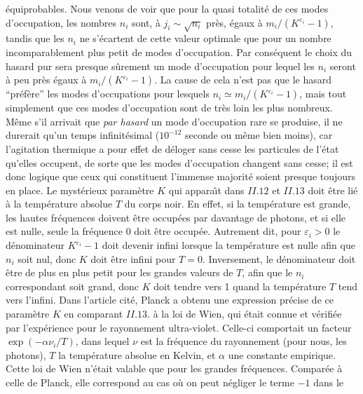 \'equi\-pro\-bables. Nous venons de voir que pour la quasi totalit\'e 
de ces modes d'occupation, les nombres $n_i$ sont, \`a $j_i 
\sim \sqrt{n_i}$ pr\`es, \'egaux \`a $m_i \bigl/ (K^{\varepsilon_i} - 
1)$, tandis que les $n_i$ ne s'\'ecartent de cette valeur optimale que 
pour un nombre incomparablement plus petit de modes d'occupation.  
Par cons\'equent le choix du hasard pur sera presque s\^urement un  
mode d'occupation pour lequel les $n_i$ seront \`a peu pr\`es \'egaux  
\`a $m_i \bigl/ (K^{\varepsilon_i} - 1)$. La cause de cela n'est pas que  
le hasard ``pr\'ef\`ere'' les modes d'occupations pour lesquels 
$n_i \simeq m_i \bigl/ (K^{\varepsilon_i} - 1)$, mais tout simplement  
que ces modes d'occupation sont de tr\`es loin les plus nombreux. 
\medskip   
M\^eme s'il arrivait que {\it par hasard} un mode d'occupation rare se 
produise, il ne durerait qu'un temps infinit\'esimal ($10^{-12}$ seconde 
ou m\^eme bien moins), car l'agitation thermique a pour effet de 
d\'eloger sans cesse les particules de l'\'etat qu'elles occupent, de 
sorte que les modes d'occupation changent sans cesse; il est donc 
logique que ceux qui constituent l'immense majorit\'e soient presque 
toujours en place.  
\medskip 
Le myst\'erieux param\`etre $K$ qui appara\^\i t dans $II.12$ et $II.13$ 
doit \^etre li\'e \`a la temp\'erature absolue $T$ du corps noir. En effet,  
si la temp\'erature est grande, les  hautes fr\'equences doivent \^etre 
occup\'ees par davantage de  photons, et si elle est nulle, seule la 
fr\'equence 0 doit \^etre  occup\'ee. Autrement dit, pour $\varepsilon_i > 
0$ le d\'enominateur $K^{\varepsilon_i} - 1$ doit devenir infini lorsque  
la temp\'erature est nulle afin que $n_i$ soit nul, donc $K$ doit \^etre 
infini pour $T=0$. Inversement, le d\'enominateur doit \^etre de plus en 
plus petit pour les grandes valeurs de $T$, afin que le $n_i$ 
correspondant soit grand,  donc $K$ doit tendre vers 1 quand la 
temp\'erature $T$ tend  vers l'infini.  Dans l'article cit\'e, Planck a  
obtenu une expression pr\'ecise de ce param\`etre $K$ en comparant  
$II.13.$ \`a la loi de Wien, qui \'etait connue et v\'erifi\'ee par  
l'exp\'erience pour le rayonnement ultra-violet. Celle-ci comportait un  
facteur $\exp (-\alpha\nu_i / T)$, dans lequel $\nu$ est la fr\'equence  
du rayonnement (pour nous, les photons), $T$ la temp\'erature absolue en 
Kelvin, et $\alpha$ une constante empirique.  
\medskip 
Cette loi de Wien n'\'etait valable que pour les grandes fr\'equences.  
Compar\'ee \`a celle de Planck, elle 
correspond au cas o\`u on peut n\'egliger le terme $-1$ dans le 
